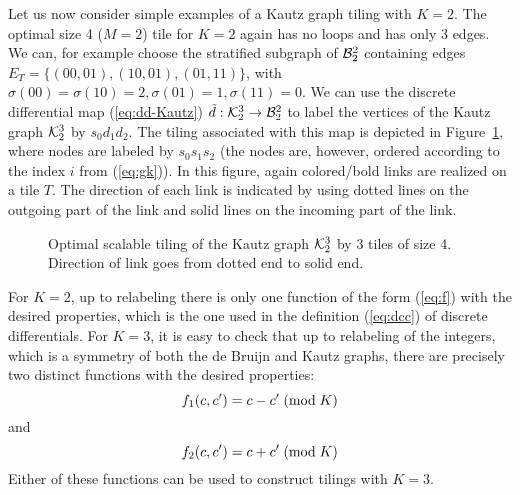 \documentclass[12pt]{article}
\begin{document}
Let us now consider simple examples of a Kautz graph tiling with $K =
2$.  The optimal size 4 ($M = 2$) tile for $K = 2$ again has no loops
and has only 3 edges.  We can, for example choose the stratified
subgraph of ${\cal B}_2^2$ containing edges $E_T =\{(00, 01), (10,
01), (01, 11)\}$, with $\sigma (00) = \sigma (10) = 2, \sigma (01) =
1, \sigma (11) = 0$.  We can use the discrete differential map
(\ref{eq:dd-Kautz}) $\tilde{d}:{\cal K}_2^3 \rightarrow{\cal B}_2^2$
to label the vertices of the Kautz graph ${\cal K}_2^3$ by $s_0
d_1 d_2$.  The tiling associated with this map is depicted in
Figure~\ref{f:k23-4}, where nodes are labeled by $s_0 s_1 s_2$ (the
nodes are, however, ordered according to the index $i$ from
(\ref{eq:gk})).  In this figure, again colored/bold links are realized
on a tile $T$.  The direction of each link is indicated by using
dotted lines on the outgoing part of the link and solid lines on the
incoming part of the link.
\begin{figure}
\begin{center}
\end{center}
\caption[x]{\footnotesize Optimal scalable tiling of the Kautz graph
  ${\cal K}_2^3$ by 3 tiles of size 4.  Direction of link goes from
  dotted end to solid end.}
\label{f:k23-4}
\end{figure}

For $K = 2$, up to relabeling there is only one function of the form
(\ref{eq:f}) with the desired properties, which is the one used in the
definition (\ref{eq:dcc}) of discrete differentials.
For $K = 3$,   it is  easy to check that up to relabeling
of the integers, which is a symmetry of both the de Bruijn and Kautz
graphs, there are precisely two distinct functions with the desired properties:
\begin{equation}
f_1 (c, c') = c-c' \; ({\rm mod} \; K)
\end{equation}
and
\begin{equation}
f_2 (c, c') = c+c' \; ({\rm mod} \; K)
\end{equation}
Either of these functions can be used to construct tilings with $K = 3$.
\end{document}
